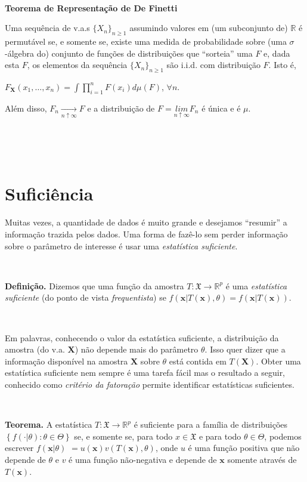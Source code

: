 \documentclass[
]{book}
\begin{document}
\(~\)

\textbf{Teorema de Representação de De Finetti}

Uma sequência de v.a.s \(\{X_n\}_{n\geq 1}\) assumindo valores em (um subconjunto de) \(\mathbb R\) é permutável se, e somente se, existe uma medida de probabilidade sobre (uma \(\sigma\)-álgebra do) conjunto de funções de distribuições que ``sorteia'' uma \(F\) e, dada esta \(F\), os elementos da sequência \(\{X_n\}_{n\geq 1}\) são i.i.d. com distribuição \(F\). Isto é,

\(F_{\mathbf X}(x_1,\ldots,x_n)=\displaystyle\int\prod_{i=1}^n F(x_i)d\mu(F)\), \(\forall n\).

Além disso, \(F_n\underset{n\uparrow\infty}{\longrightarrow}F\) e a distribuição de \(F=\underset{n\uparrow\infty}{lim}F_n\) é única e é \(\mu\).

\(~\)

\(~\)

\hypertarget{suficiuxeancia}{%
\section{Suficiência}\label{suficiuxeancia}}

Muitas vezes, a quantidade de dados é muito grande e desejamos ``resumir'' a informação trazida pelos dados. Uma forma de fazê-lo sem perder informação sobre o parâmetro de interesse é usar uma \emph{estatística suficiente}.

\(~\)

\textbf{Definição.} Dizemos que uma função da amostra \(T:\mathfrak{X} \rightarrow \mathbb{R}^p\) é uma \emph{estatística suficiente} (do ponto de vista \emph{frequentista}) se \(f\left(\boldsymbol x | T(\boldsymbol x),\theta\right) = f\left(\boldsymbol x | T(\boldsymbol x)\right)\).

\(~\)

Em palavras, conhecendo o valor da estatística suficiente, a distribuição da amostra (do v.a. \(\boldsymbol X\)) não depende mais do parâmetro \(\theta\). Isso quer dizer que a informação disponível na amostra \(\boldsymbol X\) sobre \(\theta\) está contida em \(T(\boldsymbol X)\). Obter uma estatística suficiente nem sempre é uma tarefa fácil mas o resultado a seguir, conhecido como \emph{critério da fatoração} permite identificar estatísticas suficientes.

\(~\)

\textbf{Teorema.} A estatística \(T:\mathfrak{X} \rightarrow \mathbb{R}^p\) é suficiente para a família de distribuições \(\left\{f(\cdot|\theta):\theta \in \Theta\right\}\) se, e somente se, para todo \(x \in \mathfrak{X}\) e para todo \(\theta \in \Theta\), podemos escrever \(f\left(\boldsymbol x | \theta\right)\) \(= u(\boldsymbol x) v\left(T(\boldsymbol x),\theta\right)\), onde \(u\) é uma função positiva que não depende de \(\theta\) e \(v\) é uma função não-negativa e depende de \(\boldsymbol x\) somente através de \(T(\boldsymbol x)\).
\end{document}

